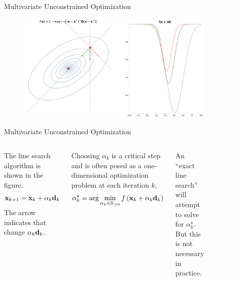 \documentclass[aspectratio=169]{beamer}
\def\mf{\ensuremath\mathbf}
\def\mb{\ensuremath\mathbb}
\def\lp{\ensuremath\left(}
\def\rp{\ensuremath\right)}
\def\R{\ensuremath\mb{R}}
\newcommand{\ct}[1]{\lp #1\rp}
\begin{document}
\begin{frame}{Multivariate Unconstrained Optimization}
  \begin{figure}
    \centering
    \includegraphics[width=0.85\textwidth]{figs/multivar_linesearch_demo.pdf}
  \end{figure}
\end{frame}


\begin{frame} {Multivariate Unconstrained Optimization}
  \begin{columns}
    The line search algorithm is shown in the figure.
    \[ \mf{x}_{k+1} = \mf{x}_{k} + \alpha_k \mf{d}_{k} \]
    The arrow indicates that change $\alpha_k \mf{d}_k$.

    Choosing $\alpha_k$ is a critical step and is often posed as a one-dimensional optimization problem at each iteration $k$,
    \[ \alpha_k^{\star} = \arg \min_{\alpha_k \in \R_{\geq 0}} f\ct{\mf{x}_k  +\alpha_k \mf{d}_k} \]

    An ``exact line search'' will attempt to solve for $\alpha_k^{\star}$. But this is not necessary in practice.
    \begin{figure}
      \centering
      \includegraphics[width=0.9\textwidth]{figs/multivar_linesearch.pdf}
    \end{figure}
  \end{columns}
\end{frame}
\end{document}
